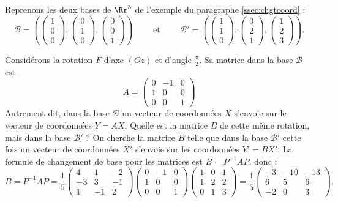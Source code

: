 \documentclass[11pt,class=report,crop=false]{standalone}
\begin{document}
\begin{exemple}
Reprenons les deux bases de $\Rr^3$ de l'exemple du paragraphe \ref{ssec:chgtcoord} :
$$\mathcal{B} =
\left(
\begin{pmatrix} 1\\0\\0\end{pmatrix},
\begin{pmatrix} 0\\1\\0\end{pmatrix},
\begin{pmatrix} 0\\0\\1\end{pmatrix}
\right)
\qquad \text{ et } \qquad
\mathcal{B}' =
\left(
\begin{pmatrix} 1 \\ 1 \\ 0\end{pmatrix},
\begin{pmatrix} 0 \\ 2 \\ 1\end{pmatrix},
\begin{pmatrix} 1 \\ 2 \\ 3\end{pmatrix}
\right).$$

Considérons la rotation $F$ d'axe $(Oz)$ et d'angle $\frac\pi2$. Sa matrice dans la base $\mathcal{B}$ est 
$$A = 
\begin{pmatrix}
0 & -1 & 0 \\
1 & 0 & 0 \\
0 & 0 & 1	
\end{pmatrix}$$
Autrement dit, dans la base $\mathcal{B}$ un vecteur de coordonnées $X$ s'envoie sur le vecteur de coordonnées $Y = AX$.
Quelle est la matrice $B$ de cette même rotation, mais dans la base $\mathcal{B}'$ ?
On cherche la matrice $B$ telle que dans la base $\mathcal{B}'$ cette fois un vecteur de coordonnées $X'$ s'envoie sur les coordonnées $Y' = BX'$.
La formule de changement de base pour les matrices est $B = P^{-1}AP$, donc :
$$B = P^{-1}AP
= 
\frac15 
\begin{pmatrix}
	4 & 1 & -2 \\
	-3 & 3 & -1 \\
	1 & -1 & 2	
\end{pmatrix}
\begin{pmatrix}
	0 & -1 & 0 \\
	1 & 0 & 0 \\
	0 & 0 & 1	
\end{pmatrix}
\begin{pmatrix}
	1 & 0 & 1 \\
	1 & 2 & 2 \\
	0 & 1 & 3
\end{pmatrix}
= \frac15\begin{pmatrix}
-3 & -10 & -13 \\
6 & 5 & 6 \\
-2 & 0 & 3
\end{pmatrix}.$$


\end{exemple}
\end{document}
